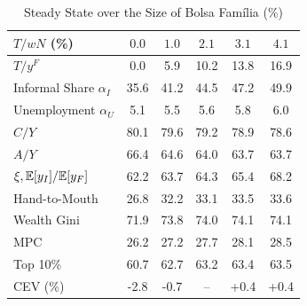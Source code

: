\begin{table}[htbp]
\centering
\caption{Steady State over the Size of Bolsa Fam\'ilia (\%)}
\label{tab:robust_bf}
\small
\begin{tabular}{lcc|c|cc}
\toprule
$T/wN$ (\%) & $0.0$ & $1.0$ & $2.1$ & $3.1$ & $4.1$ \\
\midrule
$T/y^F$ & 0.0 & 5.9 & 10.2 & 13.8 & 16.9 \\
Informal Share $\alpha_I$ & 35.6 & 41.2 & 44.5 & 47.2 & 49.9 \\
Unemployment $\alpha_U$ & 5.1 & 5.5 & 5.6 & 5.8 & 6.0 \\
$C/Y$ & 80.1 & 79.6 & 79.2 & 78.9 & 78.6 \\
$A/Y$ & 66.4 & 64.6 & 64.0 & 63.7 & 63.7 \\
$\xi, \mathbb{E}[y_I]/\mathbb{E}[y_F]$ & 62.2 & 63.7 & 64.3 & 65.4 & 68.2 \\
Hand-to-Mouth & 26.8 & 32.2 & 33.1 & 33.5 & 33.6 \\
Wealth Gini & 71.9 & 73.8 & 74.0 & 74.1 & 74.1 \\
MPC & 26.2 & 27.2 & 27.7 & 28.1 & 28.5 \\
Top 10\% & 60.7 & 62.7 & 63.2 & 63.4 & 63.5 \\
CEV (\%) & -2.8 & -0.7 & -- & +0.4 & +0.4 \\
\bottomrule
\end{tabular}
\end{table}
